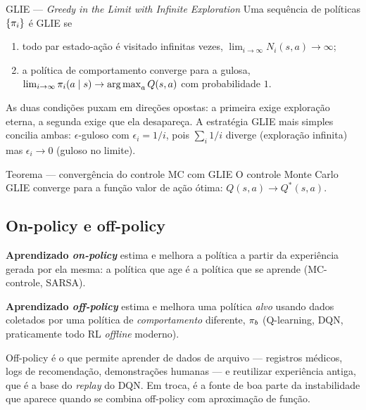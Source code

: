 \documentclass[11pt]{article}
\newcommand{\polb}{\pol_b}
\newcommand{\Qstar}{Q^{*}}
\begin{document}
\begin{defbox}{GLIE --- \emph{Greedy in the Limit with Infinite Exploration}}
  Uma sequência de políticas $\{\pi_i\}$ é GLIE se
  \begin{enumerate}[itemsep=0.1em]
    \item todo par estado-ação é visitado infinitas vezes,
      $\lim_{i \to \infty} N_i(s,a) \to \infty$;
    \item a política de comportamento converge para a gulosa,
      $\lim_{i \to \infty} \pi_i(a \mid s) \to \operatorname*{arg\,max}_{a} Q(s,a)$ com
      probabilidade $1$.
  \end{enumerate}
\end{defbox}

As duas condições puxam em direções opostas: a primeira exige exploração
eterna, a segunda exige que ela desapareça. A estratégia GLIE mais simples
concilia ambas: $\epsilon$-guloso com $\epsilon_i = 1/i$, pois
$\sum_i 1/i$ diverge (exploração infinita) mas $\epsilon_i \to 0$ (guloso no
limite).

\begin{teobox}{Teorema --- convergência do controle MC com GLIE}
  O controle Monte Carlo GLIE converge para a função valor de ação ótima:
  $Q(s,a) \to \Qstar(s,a)$.
\end{teobox}

\subsection{On-policy e off-policy}

\begin{defbox}{}
  \textbf{Aprendizado \emph{on-policy}} estima e melhora a política a partir da
  experiência gerada por ela mesma: a política que age é a política que se
  aprende (MC-controle, SARSA).

  \smallskip
  \textbf{Aprendizado \emph{off-policy}} estima e melhora uma política
  \emph{alvo} usando dados coletados por uma política de \emph{comportamento}
  diferente, $\polb$ (Q-learning, DQN, praticamente todo RL \emph{offline}
  moderno).
\end{defbox}

Off-policy é o que permite aprender de dados de arquivo --- registros médicos,
logs de recomendação, demonstrações humanas --- e reutilizar experiência
antiga, que é a base do \emph{replay} do DQN. Em troca, é a fonte de boa parte
da instabilidade que aparece quando se combina off-policy com aproximação de
função.
\end{document}
